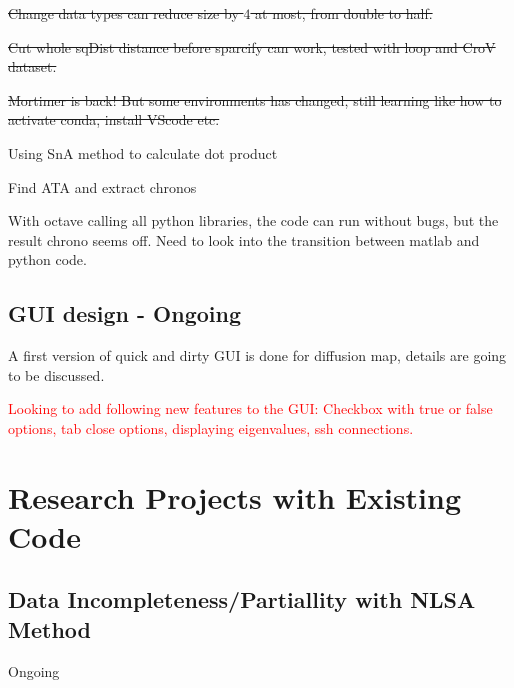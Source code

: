 \documentclass{article}
\begin{document}
\st{Change data types can reduce size by $4$ at most, from double to half.}

\st{Cut whole sqDist distance before sparcify can work, tested with loop and CroV dataset.}

\st{Mortimer is back! But some environments has changed, still learning like how to activate conda, install VScode etc.}


\noindent Using SnA method to calculate dot product

\noindent Find ATA and extract chronos

\noindent With octave calling all python libraries, the code can run without bugs, but the result chrono seems off. Need to look into the transition between matlab and python code.

\subsection*{GUI design - Ongoing}
A first version of quick and dirty GUI is done for diffusion map, details are going to be discussed.


\noindent \textcolor{red}{Looking to add following new features to the GUI: Checkbox with true or false options, tab close options, displaying eigenvalues, ssh connections.}

\section*{Research Projects with Existing Code}
\subsection*{Data Incompleteness/Partiallity with NLSA Method}
Ongoing
\end{document}

